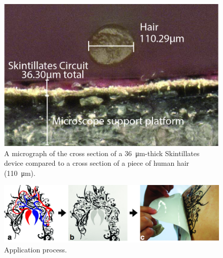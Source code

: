 \documentclass{sigchi}
\begin{document}
\begin{figure}[!h]
\centering
\includegraphics[width=1\columnwidth]{figures/Figure2}
\caption{A micrograph of the cross section of a \SI{36}{\micro\metre}-thick Skintillates device compared to a cross section of a piece of human
hair (\SI{110}{\micro\metre}).}
\vspace{-8pt}
\label{fig:micrograph}
\end{figure}
\begin{figure} [!ht]
\centering
\includegraphics[width=1.0\textwidth]{figures/Figure3}
\caption{Application process.}
\vspace{-8pt}
\label{fig:applicationprocess}
\end{figure}
\end{document}
